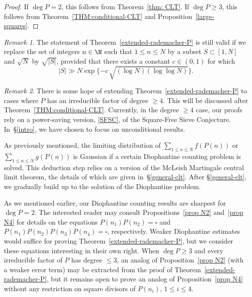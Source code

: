 \documentclass[reqno, 12pt]{amsart}
\theoremstyle{plain}
\theoremstyle{definition}
\theoremstyle{remark}
\newtheorem*{remark}{Remark}
\renewcommand{\le}{\leqslant}
\renewcommand{\ge}{\geqslant}
\renewcommand{\leq}{\leqslant}
\begin{document}
\begin{proof}
If $\deg{P}=2$, this follows from Theorem~\ref{thm: CLT}.
If $\deg{P}\ge 3$, this follows from
Theorem~\ref{THM:conditional-CLT}
and Proposition~\ref{large-squares}.
\end{proof}

\begin{remark}
The statement of Theorem~\ref{extended-rademacher-P}
is still valid if we replace the set of integers $n\in \N$ such that $1\leq n\leq N$ by a subset $S\subset [1,N]$ and $\sqrt{N}$ by $\sqrt{|S|}$,
provided that
there exists a constant $c\in (0,1)$ for which
\begin{equation}
\label{thinner}
|S|\gg N\exp\{ -c\,  \sqrt{(\log N)(\log\log N)}\}.
\end{equation}
\end{remark}

\begin{remark}
There is some hope of extending Theorem~\ref{extended-rademacher-P}
to cases where $P$ has an irreducible factor of degree $\ge 4$.
This will be discussed after Theorem~\ref{THM:conditional-CLT}.
Currently, in the degree $\ge 4$ case, our proofs rely on a
power-saving version, \eqref{SFSC}, of the Square-Free Sieve Conjecture.
In~\S\ref{intro}, we have chosen to focus on unconditional results.
\end{remark}

As previously mentioned, the limiting distribution of $\sum_{1\le n\le N} f(P(n))$ or $\sum_{1\le n\le N} g(P(n))$ is Gaussian if a certain Diophantine counting problem is solved. This deduction step relies on a version of the McLeish Martingale central limit theorem, the details of which are given in~\S\ref{general-clt}.
After \S\ref{general-clt}, we gradually build up to the solution of the Diophantine problem.

As we mentioned earlier, our Diophantine counting results are sharpest for $\deg P = 2$.
The interested reader may consult Propositions~\ref{prop N2}
and~\ref{prop N4} for details on the equations
$P(n_1)P(n_2) = \square$ and $P(n_1)P(n_2)P(n_3)P(n_4) = \square$, respectively.
Weaker Diophantine estimates would suffice
for proving Theorem~\ref{extended-rademacher-P},
but we consider these equations interesting in their own right.
When $\deg P \ge 3$ and every irreducible factor of $P$ has degree $\le 3$,
an analog of Proposition~\ref{prop N2} (with a weaker error term)
may be extracted from the proof of Theorem~\ref{extended-rademacher-P},
but it remains open to prove an analog of Proposition~\ref{prop N4}
without any restriction on square divisors of $P(n_i)$, $1\le i\le 4$.
\end{document}
